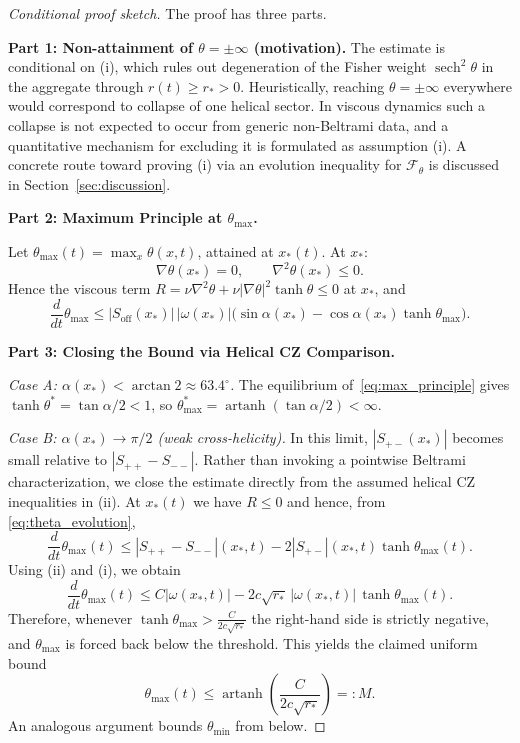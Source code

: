 \documentclass[12pt,a4paper]{article}
\theoremstyle{definition}
\newcommand{\sech}{\operatorname{sech}}
\newcommand{\artanh}{\operatorname{artanh}}
\newcommand{\F}{\mathcal{F}}
\begin{document}
\begin{proof}[Conditional proof sketch]
The proof has three parts.

\medskip\noindent\textbf{Part 1: Non-attainment of $\theta=\pm\infty$ (motivation).}
The estimate is conditional on (i), which rules out degeneration of the Fisher weight
$\sech^2\theta$ in the aggregate through $r(t)\ge r_*>0$.
Heuristically, reaching $\theta=\pm\infty$ everywhere would correspond to collapse of one helical sector.
In viscous dynamics such a collapse is not expected to occur from generic non-Beltrami data, and
a quantitative mechanism for excluding it is formulated as assumption (i).
A concrete route toward proving (i) via an evolution inequality for $\F_\theta$ is discussed in
Section~\ref{sec:discussion}.

\medskip\noindent\textbf{Part 2: Maximum Principle at $\theta_{\max}$.}

Let $\theta_{\max}(t) = \max_x \theta(x,t)$, attained at $x_*(t)$. At $x_*$:
\begin{equation}
  \nabla\theta(x_*) = 0, \qquad \nabla^2\theta(x_*) \leq 0.
\end{equation}
Hence the viscous term $R = \nu\nabla^2\theta + \nu|\nabla\theta|^2\tanh\theta \leq 0$ at $x_*$, and
\begin{equation}\label{eq:max_principle}
  \frac{d}{dt}\theta_{\max} \leq |S_{\mathrm{off}}(x_*)|\,|\omega(x_*)|\bigl(\sin\alpha(x_*) - \cos\alpha(x_*)\tanh\theta_{\max}\bigr).
\end{equation}

\medskip\noindent\textbf{Part 3: Closing the Bound via Helical CZ Comparison.}

\emph{Case A: $\alpha(x_*) < \arctan 2 \approx 63.4^\circ$.}
The equilibrium of~\eqref{eq:max_principle} gives $\tanh\theta^* = \tan\alpha / 2 < 1$, so $\theta_{\max}^* = \artanh(\tan\alpha / 2) < \infty$.

\emph{Case B: $\alpha(x_*) \to \pi/2$ (weak cross-helicity).}
In this limit, $|S_{+-}(x_*)|$ becomes small relative to $|S_{++}-S_{--}|$.
Rather than invoking a pointwise Beltrami characterization, we close the estimate
directly from the assumed helical CZ inequalities in (ii).
At $x_*(t)$ we have $R\le 0$ and hence, from \eqref{eq:theta_evolution},
\[
\frac{d}{dt}\theta_{\max}(t)
\le |S_{++}-S_{--}|(x_*,t) - 2|S_{+-}|(x_*,t)\tanh\theta_{\max}(t).
\]
Using (ii) and (i), we obtain
\[
\frac{d}{dt}\theta_{\max}(t)
\le C|\omega(x_*,t)| - 2c\sqrt{r_*}\,|\omega(x_*,t)|\,\tanh\theta_{\max}(t).
\]
Therefore, whenever $\tanh\theta_{\max} > \frac{C}{2c\sqrt{r_*}}$ the right-hand side is strictly negative,
and $\theta_{\max}$ is forced back below the threshold.
This yields the claimed uniform bound
\[
\theta_{\max}(t)\le \artanh\!\left(\frac{C}{2c\sqrt{r_*}}\right)=:M.
\]
An analogous argument bounds $\theta_{\min}$ from below.
\end{proof}
\end{document}

